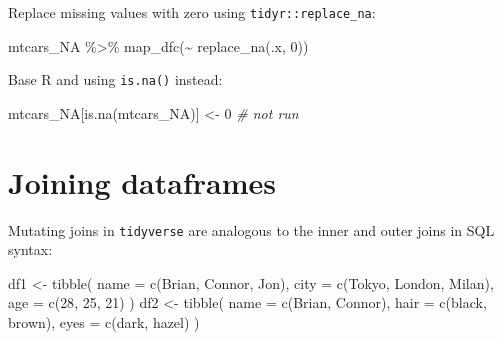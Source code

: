 \documentclass[
]{book}
\newenvironment{Shaded}{\begin{snugshade}}{\end{snugshade}}
\newcommand{\AttributeTok}[1]{\textcolor[rgb]{0.77,0.63,0.00}{#1}}
\newcommand{\CommentTok}[1]{\textcolor[rgb]{0.56,0.35,0.01}{\textit{#1}}}
\newcommand{\DecValTok}[1]{\textcolor[rgb]{0.00,0.00,0.81}{#1}}
\newcommand{\FunctionTok}[1]{\textcolor[rgb]{0.00,0.00,0.00}{#1}}
\newcommand{\NormalTok}[1]{#1}
\newcommand{\OtherTok}[1]{\textcolor[rgb]{0.56,0.35,0.01}{#1}}
\newcommand{\SpecialCharTok}[1]{\textcolor[rgb]{0.00,0.00,0.00}{#1}}
\newcommand{\StringTok}[1]{\textcolor[rgb]{0.31,0.60,0.02}{#1}}
\begin{document}
Replace missing values with zero using \texttt{tidyr::replace\_na}:

\begin{Shaded}
\begin{Highlighting}[]
\NormalTok{mtcars\_NA }\SpecialCharTok{\%\textgreater{}\%} \FunctionTok{map\_dfc}\NormalTok{(}\SpecialCharTok{\textasciitilde{}} \FunctionTok{replace\_na}\NormalTok{(.x, }\DecValTok{0}\NormalTok{))}
\end{Highlighting}
\end{Shaded}

Base R and using \texttt{is.na()} instead:

\begin{Shaded}
\begin{Highlighting}[]
\NormalTok{mtcars\_NA[}\FunctionTok{is.na}\NormalTok{(mtcars\_NA)] }\OtherTok{\textless{}{-}} \DecValTok{0} \CommentTok{\# not run}
\end{Highlighting}
\end{Shaded}

\hypertarget{joining-dataframes}{%
\section{Joining dataframes}\label{joining-dataframes}}

Mutating joins in \texttt{tidyverse} are analogous to the inner and outer joins in SQL syntax:

\begin{Shaded}
\begin{Highlighting}[]
\NormalTok{df1 }\OtherTok{\textless{}{-}} \FunctionTok{tibble}\NormalTok{(}
  \AttributeTok{name =} \FunctionTok{c}\NormalTok{(}\StringTok{\textquotesingle{}Brian\textquotesingle{}}\NormalTok{, }\StringTok{\textquotesingle{}Connor\textquotesingle{}}\NormalTok{, }\StringTok{\textquotesingle{}Jon\textquotesingle{}}\NormalTok{),}
  \AttributeTok{city =} \FunctionTok{c}\NormalTok{(}\StringTok{\textquotesingle{}Tokyo\textquotesingle{}}\NormalTok{, }\StringTok{\textquotesingle{}London\textquotesingle{}}\NormalTok{, }\StringTok{\textquotesingle{}Milan\textquotesingle{}}\NormalTok{),}
  \AttributeTok{age =} \FunctionTok{c}\NormalTok{(}\DecValTok{28}\NormalTok{, }\DecValTok{25}\NormalTok{, }\DecValTok{21}\NormalTok{)}
\NormalTok{)}
\NormalTok{df2 }\OtherTok{\textless{}{-}} \FunctionTok{tibble}\NormalTok{(}
  \AttributeTok{name =} \FunctionTok{c}\NormalTok{(}\StringTok{\textquotesingle{}Brian\textquotesingle{}}\NormalTok{, }\StringTok{\textquotesingle{}Connor\textquotesingle{}}\NormalTok{),}
  \AttributeTok{hair =} \FunctionTok{c}\NormalTok{(}\StringTok{\textquotesingle{}black\textquotesingle{}}\NormalTok{, }\StringTok{\textquotesingle{}brown\textquotesingle{}}\NormalTok{),}
  \AttributeTok{eyes =} \FunctionTok{c}\NormalTok{(}\StringTok{\textquotesingle{}dark\textquotesingle{}}\NormalTok{, }\StringTok{\textquotesingle{}hazel\textquotesingle{}}\NormalTok{)}
\NormalTok{)}
\end{Highlighting}
\end{Shaded}
\end{document}
